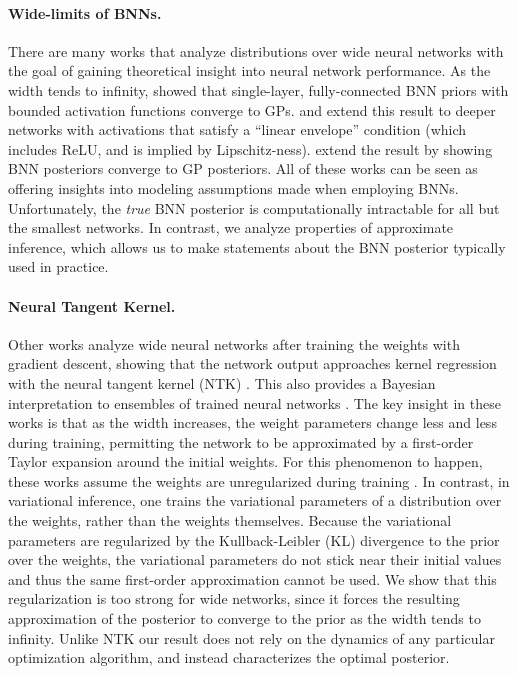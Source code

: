 \documentclass[twoside]{article}
\theoremstyle{theoremstyle}
\begin{document}
	\paragraph{Wide-limits of BNNs.}
	There are many works that analyze distributions over wide neural networks with the goal of gaining theoretical insight into neural network performance. As the width tends to infinity, \citet{neal_1996} showed that single-layer, fully-connected BNN priors with bounded activation functions converge to GPs.   and \citet{ matthews_2018} extend this result to deeper networks with activations that satisfy a ``linear envelope'' condition (which includes ReLU, and is implied by Lipschitz-ness). \citet{hron_2020} extend the result by showing BNN posteriors converge to GP posteriors. All of these works can be seen as offering insights into modeling assumptions made when employing BNNs. Unfortunately, the \textit{true} BNN posterior is computationally intractable for all but the smallest networks. In contrast, we analyze properties of approximate inference, which allows us to make statements about the BNN posterior typically used in practice.
	
	\paragraph{Neural Tangent Kernel.}
	Other works analyze wide neural networks after training the weights with gradient descent, showing that the network output approaches kernel regression with the neural tangent kernel (NTK) \citep{jacot_2020, lee_2019}.
	This also provides a Bayesian interpretation to ensembles of trained neural networks \citep{he_2020}.
	The key insight in these works is that as the width increases, the weight parameters change less and less during training, permitting the network to be approximated by a first-order Taylor expansion around the initial weights.
	For this phenomenon to happen, these works assume the weights are unregularized during training \citep{chen_2020}.
	In contrast, in variational inference, one trains the variational parameters of a distribution over the weights, rather than the weights themselves. Because the variational parameters are regularized by the Kullback-Leibler (KL) divergence to the prior over the weights, the variational parameters do not stick near their initial values and thus the same first-order approximation cannot be used. We show that this regularization is too strong for wide networks, since it forces the resulting approximation of the posterior to converge to the prior as the width tends to infinity.
 Unlike NTK our result does not rely on the dynamics of any particular optimization algorithm, and instead characterizes the optimal posterior.
	
\end{document}
